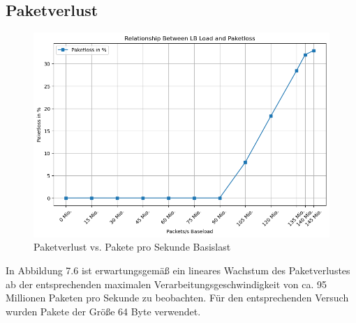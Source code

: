 \subsection{Paketverlust}
\begin{figure}
    \centering
    \includegraphics[width=1\linewidth]{images/packetloss.png}
    \caption{Paketverlust vs. Pakete pro Sekunde Basislast}
    \label{fig:enter-label}
\end{figure}
In Abbildung 7.6 ist erwartungsgemäß ein lineares Wachstum des Paketverlustes ab der entsprechenden maximalen Verarbeitungsgeschwindigkeit von ca. 95 Millionen Paketen pro Sekunde zu beobachten. Für den entsprechenden Versuch wurden Pakete der Größe 64 Byte verwendet.